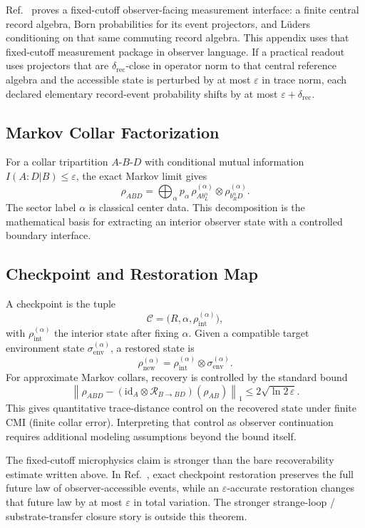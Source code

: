 Ref.~\cite{ophmicrophysics} proves a fixed-cutoff observer-facing measurement interface: a
finite central record algebra, Born probabilities for its event projectors, and L\"uders
conditioning on that same commuting record algebra. This appendix uses that fixed-cutoff
measurement package in observer language. If a practical readout uses projectors that are
\(\delta_{\mathrm{rec}}\)-close in operator norm to that central reference algebra and the
accessible state is perturbed by at most \(\varepsilon\) in trace norm, each declared elementary
record-event probability shifts by at most \(\varepsilon+\delta_{\mathrm{rec}}\).

\subsection{Markov Collar Factorization}

For a collar tripartition \(A\)-\(B\)-\(D\) with conditional mutual information
\(I(A:D|B)\le\varepsilon\), the exact Markov limit gives
\[
\rho_{ABD}
=\bigoplus_{\alpha} p_{\alpha}\,
\rho^{(\alpha)}_{A b_L^{\alpha}}
\otimes
\rho^{(\alpha)}_{b_R^{\alpha} D}.
\]
The sector label \(\alpha\) is classical center data. This decomposition is the mathematical
basis for extracting an interior observer state with a controlled boundary interface.

\subsection{Checkpoint and Restoration Map}

A checkpoint is the tuple
\[
\mathcal{C}=\bigl(R,\alpha,\rho_{\mathrm{int}}^{(\alpha)}\bigr),
\]
with \(\rho_{\mathrm{int}}^{(\alpha)}\) the interior state after fixing \(\alpha\). Given a compatible target
environment state \(\sigma_{\mathrm{env}}^{(\alpha)}\), a restored state is
\[
\rho_{\mathrm{new}}^{(\alpha)}
=
\rho_{\mathrm{int}}^{(\alpha)}
\otimes
\sigma_{\mathrm{env}}^{(\alpha)}.
\]
For approximate Markov collars, recovery is controlled by the standard bound
\[
\left\|
\rho_{ABD}
-
(\mathrm{id}_A\otimes\mathcal{R}_{B\to BD})(\rho_{AB})
\right\|_1
\le
2\sqrt{\ln 2\,\varepsilon}.
\]
This gives quantitative trace-distance control on the recovered state under finite CMI
(finite collar error). Interpreting that control as observer continuation
requires additional modeling assumptions beyond the bound itself.

The fixed-cutoff microphysics claim is stronger than the bare recoverability estimate written
above. In Ref.~\cite{ophmicrophysics}, exact checkpoint restoration preserves the full future
law of observer-accessible events, while an \(\varepsilon\)-accurate restoration changes that
future law by at most \(\varepsilon\) in total variation. The stronger strange-loop / substrate-transfer closure story
is outside this theorem.

